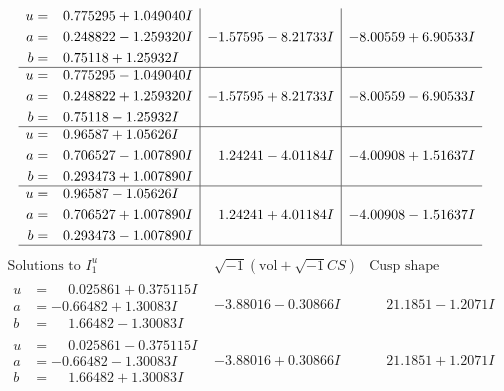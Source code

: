 \documentclass[1p]{elsarticle_modified}
\theoremstyle{definition}
\newcommand{\I}{\sqrt{-1}}
\begin{document}
$$\begin{array}{c|c|c}
\begin{aligned}
u &= \phantom{-}0.775295 + 1.049040 I \\
a &= \phantom{-}0.248822 - 1.259320 I \\
b &= \phantom{-}0.75118 + 1.25932 I\end{aligned}
 & -1.57595 - 8.21733 I & -8.00559 + 6.90533 I \\ \hline\begin{aligned}
u &= \phantom{-}0.775295 - 1.049040 I \\
a &= \phantom{-}0.248822 + 1.259320 I \\
b &= \phantom{-}0.75118 - 1.25932 I\end{aligned}
 & -1.57595 + 8.21733 I & -8.00559 - 6.90533 I \\ \hline\begin{aligned}
u &= \phantom{-}0.96587 + 1.05626 I \\
a &= \phantom{-}0.706527 - 1.007890 I \\
b &= \phantom{-}0.293473 + 1.007890 I\end{aligned}
 & \phantom{-}1.24241 - 4.01184 I & -4.00908 + 1.51637 I \\ \hline\begin{aligned}
u &= \phantom{-}0.96587 - 1.05626 I \\
a &= \phantom{-}0.706527 + 1.007890 I \\
b &= \phantom{-}0.293473 - 1.007890 I\end{aligned}
 & \phantom{-}1.24241 + 4.01184 I & -4.00908 - 1.51637 I\\
 \hline 
 \end{array}$$\newpage$$\begin{array}{c|c|c}  
\text{Solutions to }I^u_{1}& \I (\text{vol} + \sqrt{-1}CS) & \text{Cusp shape}\\
 \hline 
\begin{aligned}
u &= \phantom{-}0.025861 + 0.375115 I \\
a &= -0.66482 + 1.30083 I \\
b &= \phantom{-}1.66482 - 1.30083 I\end{aligned}
 & -3.88016 - 0.30866 I & \phantom{-}21.1851 - 1.2071 I \\ \hline\begin{aligned}
u &= \phantom{-}0.025861 - 0.375115 I \\
a &= -0.66482 - 1.30083 I \\
b &= \phantom{-}1.66482 + 1.30083 I\end{aligned}
 & -3.88016 + 0.30866 I & \phantom{-}21.1851 + 1.2071 I \\ \hline\begin{aligned}

\end{aligned}
\end{array}$$
\end{document}

